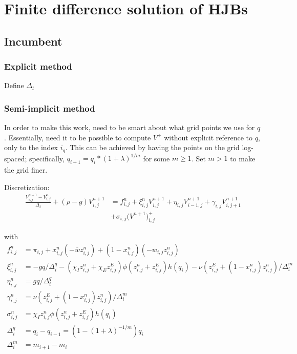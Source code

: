 \documentclass[12pt,english]{article}
\theoremstyle{remark}
\begin{document}
\section{Finite difference solution of HJBs}
\subsection{Incumbent}
\subsubsection{Explicit method}

Define $\Delta_t$ 


\subsubsection{Semi-implicit method}
In order to make this work, need to be smart about what grid points we use for $q$. Essentially, need it to be possible to compute $V^+$ without explicit reference to $q$, only to the index $i_q$. This can be achieved by having the points on the grid log-spaced; specifically, $q_{i+1} = q_i * (1+\lambda)^{1/m}$ for some $m \ge 1$. Set $m > 1$ to make the grid finer. 

Discretization:  
\begin{align*}
\frac{V_{i,j}^{n+1} - V_{i,j}^n}{\Delta_t} + (\rho - g) V_{i,j}^{n+1} &= f_{i,j}^n + \xi_{i,j}^n V_{i,j}^{n+1} + \eta_{i,j} V_{i-1,j}^{n+1} + \gamma_{i,j} V_{i,j+1}^{n+1} \\
&+ \sigma_{i,j} \big(V^{n+1}\big)^+_{i,j}
\end{align*}

with 
\begin{align*}
f_{i,j}^n &= \pi_{i,j} + x_{i,j}^n (-\overline{w} z_{i,j}^n) + (1-x_{i,j}^n) (-w_{i,j} z_{i,j}^n) \\
\xi_{i,j}^n &= -gq/\Delta^q_i - (\chi_I z_{i,j}^n + \chi_E z_{i,j}^E) \phi(z_{i,j}^n +z_{i,j}^E) h(q_i) - \nu(z_{i,j}^E + (1-x_{i,j}^n)z_{i,j}^n) / \Delta^m_i\\
\eta_{i,j}^n &= gq/\Delta^q_i \\
\gamma_{i,j}^n &= \nu(z_{i,j}^E + (1-x_{i,j}^n)z_{i,j}^n) / \Delta^m_i \\
\sigma_{i,j}^n &= \chi_I z_{i,j}^n \phi (z_{i,j}^n + z_{i,j}^E) h(q_i) \\
\Delta_i^q &= q_i - q_{i-1} = ( 1 - (1+\lambda)^{-1/m} ) q_i \\
\Delta_i^m &= m_{i+1} - m_i
\end{align*}
\end{document}
